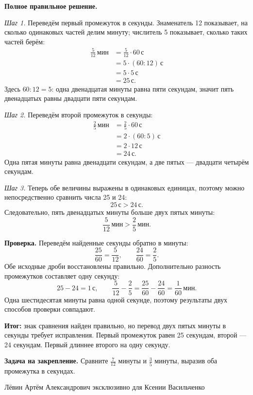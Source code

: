 \documentclass[11pt,a4paper]{article}
\begin{document}
\textbf{Полное правильное решение.}

\textit{Шаг 1.} Переведём первый промежуток в секунды. Знаменатель 12 показывает, на сколько одинаковых частей делим минуту; числитель 5 показывает, сколько таких частей берём:
\[
\begin{aligned}
 \frac{5}{12}\,\text{мин}
 &=\frac{5}{12}\cdot60\,\text{с}\\
 &=5\cdot(60:12)\,\text{с}\\
 &=5\cdot5\,\text{с}\\
 &=25\,\text{с}.
\end{aligned}
\]
Здесь $60:12=5$: одна двенадцатая минуты равна пяти секундам, значит пять двенадцатых равны двадцати пяти секундам.

\textit{Шаг 2.} Переведём второй промежуток в секунды:
\[
\begin{aligned}
 \frac25\,\text{мин}
 &=\frac25\cdot60\,\text{с}\\
 &=2\cdot(60:5)\,\text{с}\\
 &=2\cdot12\,\text{с}\\
 &=24\,\text{с}.
\end{aligned}
\]
Одна пятая минуты равна двенадцати секундам, а две пятых --- двадцати четырём секундам.

\textit{Шаг 3.} Теперь обе величины выражены в одинаковых единицах, поэтому можно непосредственно сравнить числа 25 и 24:
\[
 25\,\text{с}>24\,\text{с}.
\]
Следовательно, пять двенадцатых минуты больше двух пятых минуты:
\[
  \boxed{\frac{5}{12}\,\text{мин}>\frac25\,\text{мин}}.
\]

\textbf{Проверка.} Переведём найденные секунды обратно в минуты:
\[
  \frac{25}{60}=\frac{5}{12},
  \qquad
  \frac{24}{60}=\frac25.
\]
Обе исходные дроби восстановлены правильно. Дополнительно разность промежутков составляет одну секунду:
\[
 25-24=1\,\text{с},
 \qquad
 \frac{5}{12}-\frac25
 =\frac{25}{60}-\frac{24}{60}
 =\frac1{60}\,\text{мин}.
\]
Одна шестидесятая минуты равна одной секунде, поэтому результаты двух способов проверки совпадают.

\textcolor{teal!60!black}{\textbf{Итог:}} знак сравнения найден правильно, но перевод двух пятых минуты в секунды требует исправления. Первый промежуток равен 25 секундам, второй --- 24 секундам. Первый длиннее второго на одну секунду.

\textbf{Задача на закрепление.}
Сравните $\frac{7}{12}$ минуты и $\frac35$ минуты, выразив оба промежутка в секундах.

\vfill
\begin{center}
\footnotesize Лёвин Артём Александрович эксклюзивно для Ксении Васильченко
\end{center}
\end{document}
